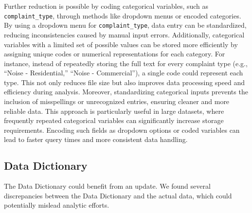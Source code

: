 \documentclass[linenumber]{jdsart}
\begin{document}
Further reduction is possible by coding categorical 
variables, such as \texttt{complaint\_type}, through methods like dropdown 
menus or encoded categories. By using a dropdown menu for 
\texttt{complaint\_type}, data entry can be standardized, reducing 
inconsistencies caused by manual input errors. Additionally, categorical 
variables with a limited set of possible values can be stored more 
efficiently by assigning unique codes or numerical representations for 
each category. For instance, instead of repeatedly storing the full text 
for every complaint type (e.g., ``Noise - Residential,'' ``Noise - 
Commercial''), a single code could represent each type. This not only 
reduces file size but also improves data processing speed and efficiency 
during analysis. Moreover, standardizing categorical inputs prevents 
the inclusion of misspellings or unrecognized entries, ensuring cleaner 
and more reliable data. This approach is particularly useful in large 
datasets, where frequently repeated categorical variables can 
significantly increase storage requirements. Encoding such fields 
as dropdown options or coded variables can lead to faster query times 
and more consistent data handling.



\subsection{Data Dictionary} 
\label{sec:datadictionary}

The Data Dictionary could benefit from an update. We found several 
discrepancies between the Data Dictionary and the actual data, which 
could potentially mislead analytic efforts.
\end{document}
